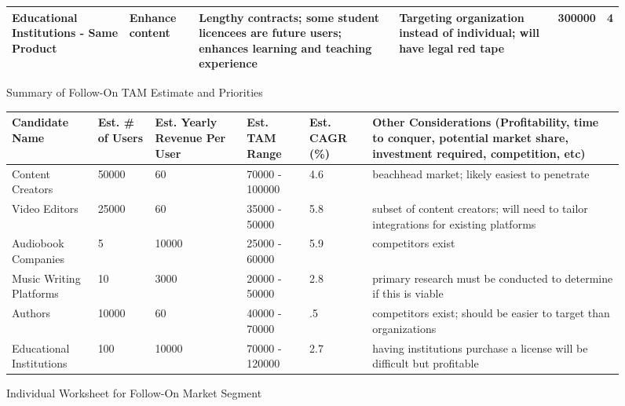\documentclass{article}
\begin{document}
\begin{figure}[h!]
\begin{center}
\begin{tabular}{| p{2.5cm} | p{1.6cm} | p{3.5cm} | p{3.65cm} | p{1.1cm} | c |}
                \\ \hline
                \raggedright Educational Institutions - Same Product & 
                    \raggedright Enhance content &
                    \raggedright Lengthy contracts; some student licencees are future users; enhances learning and teaching experience & 
                    \raggedright Targeting organization instead of individual; will have legal red tape & 300000 & 4
                \\ \hline
            \end{tabular}
            \caption{Summary of Follow-On TAM Estimate and Priorities}
        \end{center}
    \end{figure}

    \begin{figure}[h!]
        \begin{center}
            \begin{tabular}{| p{1.9cm} | p{1.5cm} | p{1.6cm} | p{1.1cm} | p{1.25cm} | p{5cm} |}
                \hline
                \raggedright \textbf{Candidate Name} &
                    \raggedright \textbf{Est. \# of Users} & 
                    \raggedright \textbf{Est. Yearly Revenue Per User} & 
                    \raggedright \textbf{Est. TAM Range} & 
                    \raggedright \textbf{Est. CAGR (\%)} &
                    \textbf{Other Considerations (Profitability, time to conquer, potential market share, investment required, competition, etc)} 
                \\ \hline
                \raggedright Content Creators & 50000 & 60 & 70000 - 100000 & 4.6 & beachhead market; likely easiest to penetrate
                \\ \hline
                \raggedright Video Editors & 25000 & 60 & 35000 - 50000 & 5.8 & subset of content creators; will need to tailor integrations for existing platforms
                \\ \hline
                \raggedright Audiobook Companies & 5 & 10000 & 25000 - 60000 & 5.9 & competitors exist
                \\ \hline
                \raggedright Music Writing Platforms & 10 & 3000 & 20000 - 50000 & 2.8 & primary research must be conducted to determine if this is viable
                \\ \hline
                \raggedright Authors & 10000 & 60 & 40000 - 70000 & .5 & competitors exist; should be easier to target than organizations
                \\ \hline
                \raggedright Educational Institutions & 100 & 10000 & 70000 - 120000 & 2.7 & having institutions purchase a license will be difficult but profitable
                \\ \hline
            \end{tabular}
            \caption{Individual Worksheet for Follow-On Market Segment}
        \end{center}
    \end{figure}
\end{document}
